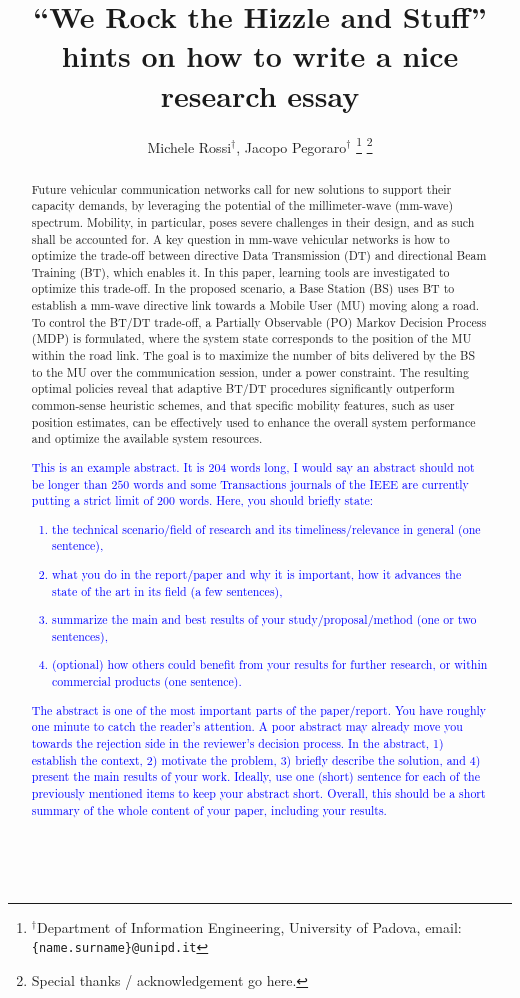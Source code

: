 \documentclass[10pt, conference, letterpaper]{IEEEtran}
\title{``We Rock the Hizzle and Stuff'' \\ hints on how to write a nice research essay}
\author{Michele Rossi$^\dag$, Jacopo Pegoraro$^\dag$
\thanks{$^\dag$Department of Information Engineering, University of Padova, \newline email: \texttt{\{name.surname\}@unipd.it}}
\thanks{Special thanks / acknowledgement go here.}
}
\newcommand\MR[1]{\textcolor{blue}{#1}}
\begin{document}
\maketitle

\begin{abstract}
Future vehicular communication networks call for new solutions to support their capacity demands, by leveraging the potential of the \mbox{millimeter-wave} (\mbox{mm-wave}) spectrum. Mobility, in particular, poses severe challenges in their design, and as such shall be accounted for. A key question in \mbox{mm-wave} vehicular networks is how to optimize the \mbox{trade-off} between directive Data Transmission (DT) and directional Beam Training (BT), which enables it. In this paper, learning tools are investigated to optimize this \mbox{trade-off}. In the proposed scenario, a Base Station (BS) uses BT to establish a \mbox{mm-wave} directive link towards a Mobile User (MU) moving along a road. To control the BT/DT \mbox{trade-off}, a Partially Observable (PO) Markov Decision Process (MDP) is formulated, where the system state corresponds to the position of the MU within the road link. The goal is to maximize the number of bits delivered by the BS to the MU over the communication session, under a power constraint. The resulting optimal policies reveal that adaptive BT/DT procedures significantly outperform \mbox{common-sense} heuristic schemes, and that specific mobility features, such as user position estimates, can be effectively used to enhance the overall system performance and optimize the available system resources.\\ 

\MR{This is an example abstract. It is $204$ words long, I would say an abstract should not be longer than $250$ words and some Transactions journals of the IEEE are currently putting a strict limit of $200$ words. Here, you should briefly state: 
\begin{enumerate}
\item the technical scenario/field of research and its timeliness/relevance in general (one sentence),
\item what you do in the report/paper and why it is important, how it advances the state of the art in its field (a few sentences), 
\item summarize the main and best results of your study/proposal/method (one or two sentences),
\item (optional) how others could benefit from your results for further research, or within commercial products (one sentence).
\end{enumerate}  
The abstract is one of the most important parts of the paper/report. You have roughly one minute to catch the reader's attention. A poor abstract may already move you towards the rejection side in the reviewer's decision process. In the abstract, 1) establish the context, 2) motivate the problem, 3) briefly describe the solution, and 4) present the main results of your work. Ideally, use one (short) sentence for each of the previously mentioned items to keep your abstract short. Overall, this should be a short summary of the whole content of your paper, including your results.}\\


\end{abstract}
\end{document}
